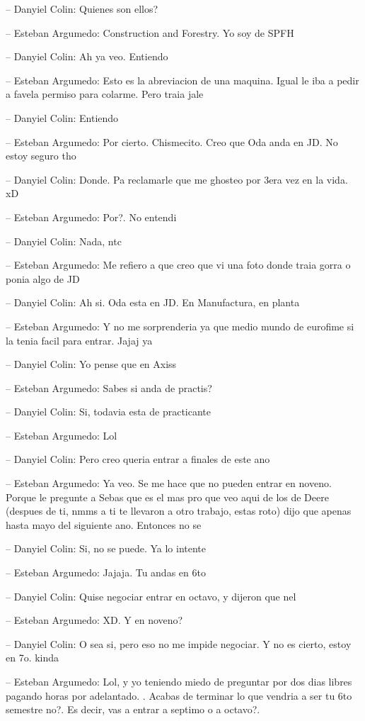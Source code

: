 -- Danyiel Colin: Quienes son ellos?

-- Esteban Argumedo: Construction and Forestry. Yo soy de SPFH

-- Danyiel Colin: Ah ya veo. Entiendo

-- Esteban Argumedo: Esto es la abreviacion de una maquina. Igual le iba
a pedir a favela permiso para colarme. Pero traia jale

-- Danyiel Colin: Entiendo

-- Esteban Argumedo: Por cierto. Chismecito. Creo que Oda anda en JD. No
estoy seguro tho

-- Danyiel Colin: Donde. Pa reclamarle que me ghosteo por 3era vez en la
vida. xD

-- Esteban Argumedo: Por?. No entendi

-- Danyiel Colin: Nada, ntc

-- Esteban Argumedo: Me refiero a que creo que vi una foto donde traia
gorra o ponia algo de JD

-- Danyiel Colin: Ah si. Oda esta en JD. En Manufactura, en planta

-- Esteban Argumedo: Y no me sorprenderia ya que medio mundo de eurofime
si la tenia facil para entrar. Jajaj ya

-- Danyiel Colin: Yo pense que en Axiss

-- Esteban Argumedo: Sabes si anda de practis?

-- Danyiel Colin: Si, todavia esta de practicante

-- Esteban Argumedo: Lol

-- Danyiel Colin: Pero creo queria entrar a finales de este ano

-- Esteban Argumedo: Ya veo. Se me hace que no pueden entrar en noveno.
Porque le pregunte a Sebas que es el mas pro que veo aqui de los de
Deere (despues de ti, nmms a ti te llevaron a otro trabajo, estas roto)
dijo que apenas hasta mayo del siguiente ano. Entonces no se

-- Danyiel Colin: Si, no se puede. Ya lo intente

-- Esteban Argumedo: Jajaja. Tu andas en 6to

-- Danyiel Colin: Quise negociar entrar en octavo, y dijeron que nel

-- Esteban Argumedo: XD. Y en noveno?

-- Danyiel Colin: O sea si, pero eso no me impide negociar. Y no es
cierto, estoy en 7o. kinda

-- Esteban Argumedo: Lol, y yo teniendo miedo de preguntar por dos dias
libres pagando horas por adelantado. . Acabas de terminar lo que vendria
a ser tu 6to semestre no?. Es decir, vas a entrar a septimo o a octavo?.

